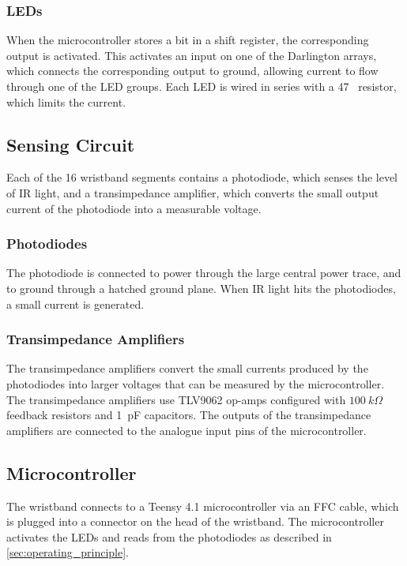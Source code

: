 \documentclass[ oneside,%
                    author={Jack Jarvis},
                    degree={BSc},
                     title={FlexIR: Flexible PCB Wristbands for Infrared Based Gesture Recognition},
                    unit={COMS30045},
                    subtitle={Investigating the Effect of LED Viewing Angle on Gesture Classification in Infrared Sensing Systems}]{dissertation}
\begin{document}
\subsubsection{LEDs}
When the microcontroller stores a bit in a shift register, the corresponding output is activated. This activates an input on one of the Darlington arrays, which connects the corresponding output to ground, allowing current to flow through one of the LED groups. Each LED is wired in series with a 47 \ohm\ resistor, which limits the current.

\subsection{Sensing Circuit}
Each of the 16 wristband segments contains a photodiode, which senses the level of IR light, and a transimpedance amplifier, which converts the small output current of the photodiode into a measurable voltage.
\subsubsection{Photodiodes}
The photodiode is connected to power through the large central power trace, and to ground through a hatched ground plane. When IR light hits the photodiodes, a small current is generated.
\subsubsection{Transimpedance Amplifiers}
The transimpedance amplifiers convert the small currents produced by the photodiodes into larger voltages that can be measured by the microcontroller. The transimpedance amplifiers use TLV9062 op-amps configured with $100~k\Omega$ feedback resistors and 1~pF capacitors. The outputs of the transimpedance amplifiers are connected to the analogue input pins of the microcontroller.

\subsection{Microcontroller}
The wristband connects to a Teensy 4.1 microcontroller via an FFC cable, which is plugged into a connector on the head of the wristband. The microcontroller activates the LEDs and reads from the photodiodes as described in \cref{sec:operating_principle}.
\end{document}
